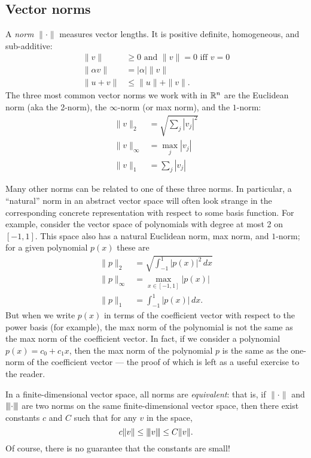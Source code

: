 \documentclass[12pt, leqno]{article} %
\begin{document}
\subsection{Vector norms}

A {\em norm} $\|\cdot\|$ measures vector lengths.  It is
positive definite, homogeneous, and sub-additive:
\begin{align*}
  \|v\| & \geq 0 \mbox{ and } \|v\| = 0 \mbox{ iff } v = 0 \\
  \|\alpha v\| &= |\alpha| \|v\| \\
  \|u+v\| & \leq \|u\| + \|v\|.
\end{align*}
The three most common vector norms we work with in $\mathbb{R}^n$ are the
Euclidean norm (aka the 2-norm), the $\infty$-norm (or max norm),
and the $1$-norm:
\begin{align*}
  \|v\|_2 &= \sqrt{\sum_j |v_j|^2} \\
  \|v\|_\infty &= \max_j |v_j| \\
  \|v\|_1 &= \sum_j |v_j|
\end{align*}

Many other norms can be related to one of these three norms.  In
particular, a ``natural'' norm in an abstract vector space will often
look strange in the corresponding concrete representation with respect
to some basis function.  For example, consider the vector space of
polynomials with degree at most 2 on $[-1,1]$.  This space also has
a natural Euclidean norm, max norm, and $1$-norm; for a given
polynomial $p(x)$ these are
\begin{align*}
  \|p\|_2 &= \sqrt{ \int_{-1}^1 |p(x)|^2 \, dx } \\
  \|p\|_\infty &= \max_{x \in [-1,1]} |p(x)| \\
  \|p\|_1 &= \int_{-1}^1 |p(x)| \, dx.
\end{align*}
But when we write $p(x)$ in terms of the coefficient vector with
respect to the power basis (for example), the max norm of the
polynomial is not the same as the max norm of the coefficient vector.
In fact, if we consider a polynomial $p(x) = c_0 + c_1 x$, then
the max norm of the polynomial $p$ is the same as the one-norm of the
coefficient vector --- the proof of which is left as a useful exercise
to the reader.

In a finite-dimensional vector space, all norms are {\em equivalent}:
that is, if $\|\cdot\|$ and ${\left\vert\kern-0.25ex\left\vert\kern-0.25ex\left\vert \cdot \right\vert\kern-0.25ex\right\vert\kern-0.25ex\right\vert}$ are two norms on the
same finite-dimensional vector space, then there exist constants $c$
and $C$ such that for any $v$ in the space,
\[
  c \|v\| \leq {\left\vert\kern-0.25ex\left\vert\kern-0.25ex\left\vert v \right\vert\kern-0.25ex\right\vert\kern-0.25ex\right\vert} \leq C \|v\|.
\]
Of course, there is no guarantee that the constants are small!
\end{document}
